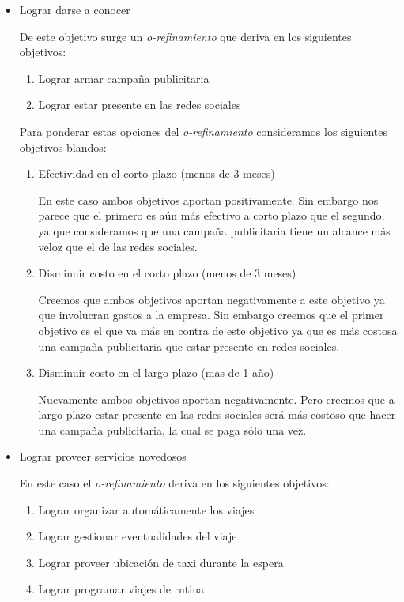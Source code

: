\documentclass[a4paper, 10pt, twoside]{article}
\begin{document}
\begin{itemize}
\item Lograr darse a conocer

  De este objetivo surge un \emph{o-refinamiento} que deriva en los siguientes objetivos:
  \begin{enumerate}
    \item Lograr armar campaña publicitaria
    \item Lograr estar presente en las redes sociales
  \end{enumerate}
	
  Para ponderar estas opciones del \emph{o-refinamiento} consideramos los siguientes objetivos blandos:
  \begin{enumerate}
    \item Efectividad en el corto plazo (menos de 3 meses)
      
      En este caso ambos objetivos aportan positivamente. Sin embargo nos parece que el primero es aún más efectivo a corto plazo que el segundo, ya que consideramos que una campaña publicitaria tiene un alcance más veloz que el de las redes sociales.

    \item Disminuir costo en el corto plazo (menos de 3 meses) %
      
      Creemos que ambos objetivos aportan negativamente a este objetivo ya que involucran gastos a la empresa. Sin embargo creemos que el primer objetivo es el que va más en contra de este objetivo ya que es más costosa una campaña publicitaria que estar presente en redes sociales.
    
    \item Disminuir costo en el largo plazo (mas de 1 año)
      
      Nuevamente ambos objetivos aportan negativamente. Pero creemos que a largo plazo estar presente en las redes sociales será más costoso que hacer una campaña publicitaria, la cual se paga sólo una vez.
  \end{enumerate}

\item Lograr proveer servicios novedosos
  
  En este caso el \emph{o-refinamiento} deriva en los siguientes objetivos:
  \begin{enumerate}
    \item Lograr organizar automáticamente los viajes
    \item Lograr gestionar eventualidades del viaje
    \item Lograr proveer ubicación de taxi durante la espera
    \item Lograr programar viajes de rutina
  \end{enumerate}
  

\end{itemize}
\end{document}
